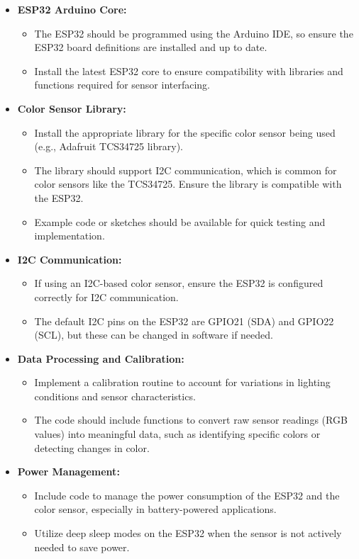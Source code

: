 \begin{itemize}
	\item \textbf{ESP32 Arduino Core:}
	\begin{itemize}
		\item The ESP32 should be programmed using the Arduino IDE, so ensure the ESP32 board definitions are installed and up to date.
		\item Install the latest ESP32 core to ensure compatibility with libraries and functions required for sensor interfacing.
	\end{itemize}
	
	\item \textbf{Color Sensor Library:}
	\begin{itemize}
		\item Install the appropriate library for the specific color sensor being used (e.g., Adafruit TCS34725 library).
		\item The library should support I2C communication, which is common for color sensors like the TCS34725. Ensure the library is compatible with the ESP32.
		\item Example code or sketches should be available for quick testing and implementation.
	\end{itemize}
	
	\item \textbf{I2C Communication:}
	\begin{itemize}
		\item If using an I2C-based color sensor, ensure the ESP32 is configured correctly for I2C communication.
		\item The default I2C pins on the ESP32 are GPIO21 (SDA) and GPIO22 (SCL), but these can be changed in software if needed.
	\end{itemize}
	
	\item \textbf{Data Processing and Calibration:}
	\begin{itemize}
		\item Implement a calibration routine to account for variations in lighting conditions and sensor characteristics.
		\item The code should include functions to convert raw sensor readings (RGB values) into meaningful data, such as identifying specific colors or detecting changes in color.
	\end{itemize}
	
	\item \textbf{Power Management:}
	\begin{itemize}
		\item Include code to manage the power consumption of the ESP32 and the color sensor, especially in battery-powered applications.
		\item Utilize deep sleep modes on the ESP32 when the sensor is not actively needed to save power.
	\end{itemize}
	

\end{itemize}
